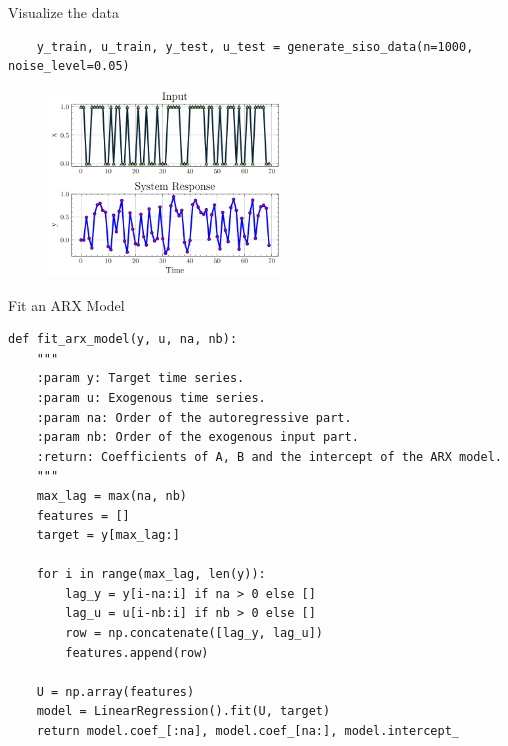 \documentclass[aspectratio=169,hyperref={pdfpagelabels=false}]{beamer}
\begin{document}
\begin{frame}[fragile]{Visualize the data}
  \begin{verbatim}
    y_train, u_train, y_test, u_test = generate_siso_data(n=1000, noise_level=0.05)
  \end{verbatim}
  \begin{figure}
    \centering
    \includegraphics[width=0.55\textwidth]{img/response.pdf}
    \label{fig:your-plot}
  \end{figure}
\end{frame}

\begin{frame}[fragile]{\small{Fit an ARX Model}}
  \begin{verbatim}
def fit_arx_model(y, u, na, nb):
    """
    :param y: Target time series.
    :param u: Exogenous time series.
    :param na: Order of the autoregressive part.
    :param nb: Order of the exogenous input part.
    :return: Coefficients of A, B and the intercept of the ARX model.
    """
    max_lag = max(na, nb)
    features = []
    target = y[max_lag:]

    for i in range(max_lag, len(y)):
        lag_y = y[i-na:i] if na > 0 else []
        lag_u = u[i-nb:i] if nb > 0 else []
        row = np.concatenate([lag_y, lag_u])
        features.append(row)

    U = np.array(features)
    model = LinearRegression().fit(U, target)
    return model.coef_[:na], model.coef_[na:], model.intercept_
  \end{verbatim}
\end{frame}
\end{document}
